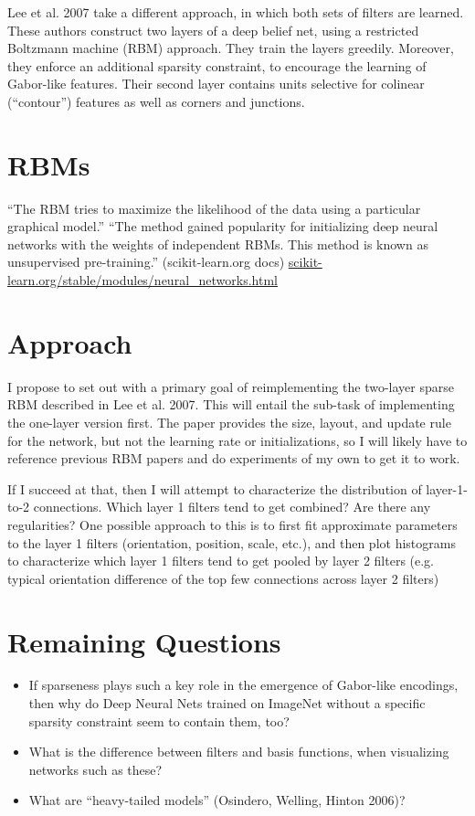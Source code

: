 \documentclass[12pt]{article}
\begin{document}
Lee et al. 2007 take a different approach, in which both sets of filters are learned. These authors construct two layers of a deep belief net, using a restricted Boltzmann machine (RBM) approach. They train the layers greedily. Moreover, they enforce an additional sparsity constraint, to encourage the learning of Gabor-like features. Their second layer contains units selective for colinear (“contour”) features as well as corners and junctions. 

\section*{RBMs}
``The RBM tries to maximize the likelihood of the data using a particular graphical model.'' ``The method gained popularity for initializing deep neural networks with the weights of independent RBMs. This method is known as unsupervised pre-training.'' (scikit-learn.org docs)
\url{scikit-learn.org/stable/modules/neural_networks.html}

\section*{Approach}

I propose to set out with a primary goal of reimplementing the two-layer sparse RBM described in Lee et al. 2007. This will entail the sub-task of implementing the one-layer version first. The paper provides the size, layout, and update rule for the network, but not the learning rate or initializations, so I will likely have to reference previous RBM papers and do experiments of my own to get it to work.

If I succeed at that, then I will attempt to characterize the distribution of layer-1-to-2 connections. Which layer 1 filters tend to get combined? Are there any regularities? One possible approach to this is to first fit approximate parameters to the layer 1 filters (orientation, position, scale, etc.), and then plot histograms to characterize which layer 1 filters tend to get pooled by layer 2 filters (e.g. typical orientation difference of the top few connections across layer 2 filters)

\section*{Remaining Questions}

\begin{itemize}
\item If sparseness plays such a key role in the emergence of Gabor-like encodings, then why do Deep Neural Nets trained on ImageNet without a specific sparsity constraint seem to contain them, too?

\item What is the difference between filters and basis functions, when visualizing networks such as these?

\item What are ``heavy-tailed models'' (Osindero, Welling, Hinton 2006)?
\end{itemize}
\end{document}
